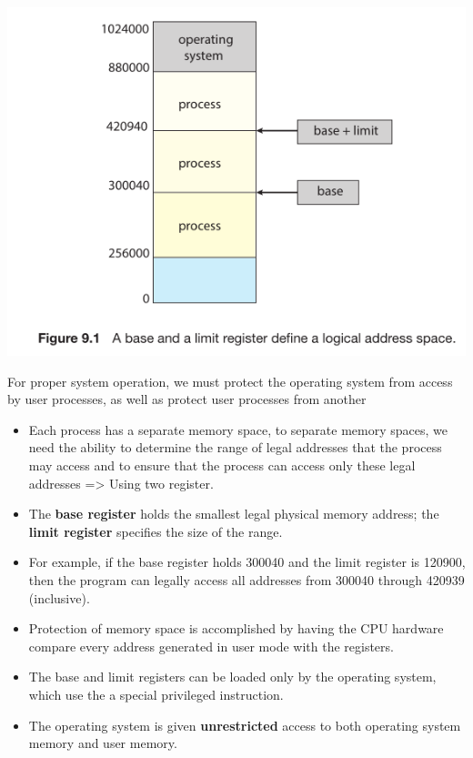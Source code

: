 \documentclass[10pt]{article}
\newcommand{\tf}{\textbf}
\begin{document}
\bigbreak
\includegraphics[scale = 0.7]{register.png}
\bigbreak

\par{For proper system operation, we must protect the operating system from access by user processes, as well as protect user processes from another}

\begin{itemize}
	\item Each process has a separate memory space, to separate memory spaces, we need the ability to determine the range of legal addresses that the process may access and to ensure that the process can access only these legal addresses => Using two register.
	\item The \tf{base register} holds the smallest legal physical memory address; the \tf{limit register} specifies the size of the range.
	\item  For example, if the base register holds 300040 and the limit register is 120900, then the program can legally access all addresses from 300040 through 420939 (inclusive).
	\item Protection of memory space is accomplished by having the CPU hardware compare every address generated in user mode with the registers.
	\item The base and limit registers can be loaded only by the operating system, which use the a special privileged instruction.
	\item The operating system is given \tf{unrestricted} access to both operating system memory and user memory.
\end{itemize}
\end{document}
